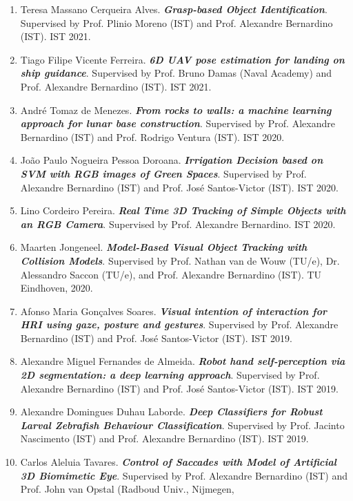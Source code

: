 \documentclass[
]{article}
\begin{document}
\begin{enumerate}
  by Prof. Catarina Barata (IST) and Prof. Alexandre Bernardino (IST).
  IST 2021.
\item
  Teresa Massano Cerqueira Alves. \emph{\textbf{Grasp-based Object
  Identification}}. Supervised by Prof. Plinio Moreno (IST) and Prof.
  Alexandre Bernardino (IST). IST 2021.
\item
  Tiago Filipe Vicente Ferreira. \emph{\textbf{6D UAV pose estimation
  for landing on ship guidance}}. Supervised by Prof. Bruno Damas (Naval
  Academy) and Prof. Alexandre Bernardino (IST). IST 2021.
\item
  André Tomaz de Menezes. \emph{\textbf{From rocks to walls: a machine
  learning approach for lunar base construction}}. Supervised by Prof.
  Alexandre Bernardino (IST) and Prof. Rodrigo Ventura (IST). IST 2020.
\item
  João Paulo Nogueira Pessoa Doroana. \emph{\textbf{Irrigation Decision
  based on SVM with RGB images of Green Spaces}}. Supervised by Prof.
  Alexandre Bernardino (IST) and Prof. José Santos-Victor (IST). IST
  2020.
\item
  Lino Cordeiro Pereira. \emph{\textbf{Real Time 3D Tracking of Simple
  Objects with an RGB Camera}}. Supervised by Prof. Alexandre
  Bernardino. IST 2020.
\item
  Maarten Jongeneel. \emph{\textbf{Model-Based Visual Object Tracking
  with Collision Models}}. Supervised by Prof. Nathan van de Wouw
  (TU/e), Dr. Alessandro Saccon (TU/e), and Prof. Alexandre Bernardino
  (IST). TU Eindhoven, 2020.
\item
  Afonso Maria Gonçalves Soares. \emph{\textbf{Visual intention of
  interaction for HRI using gaze, posture and gestures}}. Supervised by
  Prof. Alexandre Bernardino (IST) and Prof. José Santos-Victor (IST).
  IST 2019.
\item
  Alexandre Miguel Fernandes de Almeida. \emph{\textbf{Robot hand
  self-perception via 2D segmentation: a deep learning approach}}.
  Supervised by Prof. Alexandre Bernardino (IST) and Prof. José
  Santos-Victor (IST). IST 2019.
\item
  Alexandre Domingues Duhau Laborde. \emph{\textbf{Deep Classifiers for
  Robust Larval Zebrafish Behaviour Classification}}. Supervised by
  Prof. Jacinto Nascimento (IST) and Prof. Alexandre Bernardino (IST).
  IST 2019.
\item
  Carlos Aleluia Tavares. \emph{\textbf{Control of Saccades with Model
  of Artificial 3D Biomimetic Eye}}. Supervised by Prof. Alexandre
  Bernardino (IST) and Prof. John van Opstal (Radboud Univ., Nijmegen,

\end{enumerate}
\end{document}
